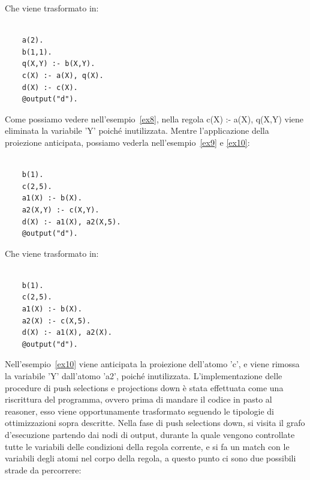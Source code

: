 Che viene trasformato in:
\begin{example}\label{ex8}
	\begin{lstlisting}
	
	a(2). 
	b(1,1). 
	q(X,Y) :- b(X,Y). 
	c(X) :- a(X), q(X). 
	d(X) :- c(X). 
	@output("d").
	\end{lstlisting}
\end{example}
Come possiamo vedere nell'esempio~\ref{ex8}, nella regola c(X) :- a(X), q(X,Y) viene eliminata la variabile 'Y' poiché inutilizzata. \newline
Mentre l'applicazione della proiezione anticipata, possiamo vederla nell'esempio~\ref{ex9} e \ref{ex10}:
\begin{example}\label{ex9}
	\begin{lstlisting}
	
	b(1). 
	c(2,5). 
	a1(X) :- b(X). 
	a2(X,Y) :- c(X,Y). 
	d(X) :- a1(X), a2(X,5). 
	@output("d").
	\end{lstlisting}
\end{example}
Che viene trasformato in:
\begin{example}\label{ex10}
	\begin{lstlisting}
	
	b(1). 
	c(2,5). 
	a1(X) :- b(X). 
	a2(X) :- c(X,5). 
	d(X) :- a1(X), a2(X). 
	@output("d").
	\end{lstlisting}
\end{example}
Nell'esempio~\ref{ex10} viene anticipata la proiezione dell'atomo 'c', e viene rimossa la variabile 'Y' dall'atomo 'a2', poiché inutilizzata. \newline \newline
L'implementazione delle procedure di push selections e projections down è stata effettuata come una riscrittura del programma, ovvero prima di mandare il codice in pasto al reasoner, esso viene opportunamente trasformato seguendo le tipologie di ottimizzazioni sopra descritte. \newline
Nella fase di push selections down, si visita il grafo d'esecuzione partendo dai nodi di output, durante la quale vengono controllate tutte le variabili delle condizioni della regola corrente, e si fa un match con le variabili degli atomi nel corpo della regola, a questo punto ci sono due possibili strade da percorrere: 
